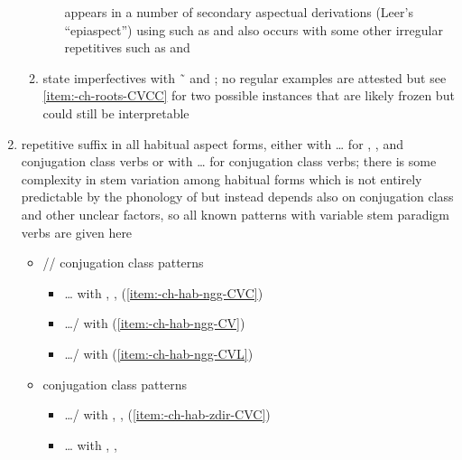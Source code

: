\begin{morphdesc}[resume*=alphalist]
\begin{enumerate}
\begin{enumerate}
\begin{itemize}
				appears in a number of secondary aspectual derivations 
				(Leer’s “epiaspect”) using  such as
				and also occurs with some other irregular repetitives such as
				and 
				\parencite[all][823]{leer:1976}
			\end{itemize}
		\item	\label{item:-ch-oddrep-state}
			state imperfectives with  \~\ 
			and ; no regular examples are attested
			but see \ref{item:-ch-roots-CVCC} for two possible instances
			that are likely frozen but could still be interpretable
		\end{enumerate}
	\item	\label{item:-ch-hab}
		repetitive suffix in all habitual aspect forms,
		either with  … 
			for , , and  conjugation class verbs
			or with  …  
			for  conjugation class verbs;
		there is some complexity in stem variation among habitual forms which is
			not entirely predictable by the phonology of 
			but instead depends also on conjugation class and other unclear factors,
			so all known patterns with variable stem paradigm verbs are given here
			\begin{itemize}
			\item	{}// conjugation class patterns
				\begin{itemize}
				\item	{}…
					with , , 
					(\ref{item:-ch-hab-ng̱g-CVC})
				\item	{}…/
					with 
					(\ref{item:-ch-hab-ng̱g-CV})
				\item	{}…/
					with 
					(\ref{item:-ch-hab-ng̱g-CVL})
				\end{itemize}
			\item	{} conjugation class patterns
				\begin{itemize}
				\item	{}…/
					with , , 
					(\ref{item:-ch-hab-zdir-CVC})
				\item	{}…
					with , , 

\end{itemize}
\end{itemize}
\end{enumerate}
\end{morphdesc}
